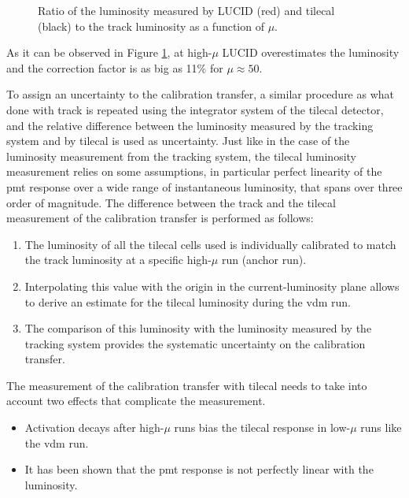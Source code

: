 \begin{figure}[ht]
\centering
{}
\caption{Ratio of the luminosity measured by LUCID (red) and \gls{tilecal} (black) to the track luminosity as a function of $\mu$.}
\label{fig:apppmt:calib_transfer}
\end{figure}

As it can be observed in Figure \ref{fig:apppmt:calib_transfer}, at high-$\mu$ LUCID overestimates the luminosity and 
the correction factor is as big as 11\% for $\mu \approx 50$. 

To assign an uncertainty to the calibration transfer, a similar procedure as what done with track is repeated using the 
integrator system of the \gls{tilecal} detector, and the relative difference between the luminosity measured by the tracking system and 
by \gls{tilecal}  is used as uncertainty. 
Just like in the case of the luminosity measurement from the tracking system, the \gls{tilecal} luminosity measurement 
relies on some assumptions, in particular perfect linearity of the \gls{pmt} response over a wide range of instantaneous luminosity, 
that spans over three order of magnitude. 
The difference between the track and the \gls{tilecal} measurement of the calibration transfer is performed as follows:
\begin{enumerate}
\item The luminosity of all the \gls{tilecal} cells used is individually calibrated to match the track luminosity 
at a specific high-$\mu$ run (anchor run).
\item Interpolating this value with the origin in the current-luminosity plane allows to derive an estimate for the \gls{tilecal} 
luminosity during the \gls{vdm} run.
\item The comparison of this luminosity with the luminosity measured by the tracking system provides the systematic uncertainty on the 
calibration transfer. 
\end{enumerate}
The measurement of the calibration transfer with \gls{tilecal} needs to take into account two effects that complicate the measurement. 
\begin{itemize}
\item Activation decays after high-$\mu$ runs bias the \gls{tilecal} response in low-$\mu$ runs like the \gls{vdm} run.
\item It has been shown that the \gls{pmt} response is not perfectly linear with the luminosity. 
\end{itemize}

